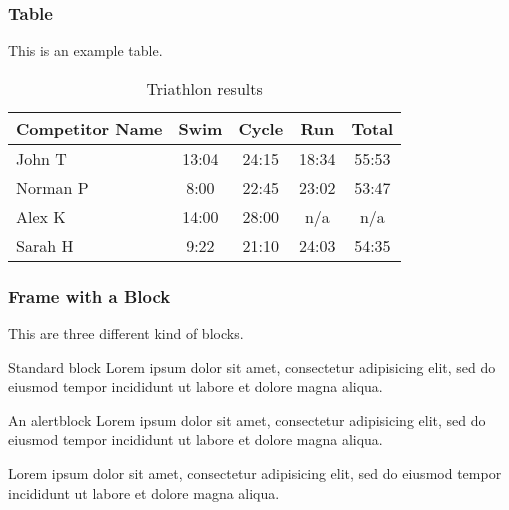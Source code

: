 \begin{frame}
    \frametitle{Table}
    This is an example table.
    \begin{table}
        \begin{tabular}{l | c | c | c | c }
            Competitor Name & Swim & Cycle & Run & Total \\
            \hline \hline
            John T & 13:04 & 24:15 & 18:34 & 55:53 \\ 
            Norman P & 8:00 & 22:45 & 23:02 & 53:47\\
            Alex K & 14:00 & 28:00 & n/a & n/a\\
            Sarah H & 9:22 & 21:10 & 24:03 & 54:35 
        \end{tabular}
        \caption{Triathlon results}
    \end{table}
\end{frame}

\begin{frame}
    \frametitle{Frame with a Block}
    This are three different kind of blocks.
    \begin{block}{Standard block}
        Lorem ipsum dolor sit amet, consectetur adipisicing elit, 
        sed do eiusmod tempor incididunt ut labore et 
        dolore magna aliqua.
    \end{block}
    \begin{alertblock}{An alertblock}
        Lorem ipsum dolor sit amet, consectetur adipisicing elit, 
        sed do eiusmod tempor incididunt ut labore et 
        dolore magna aliqua.
    \end{alertblock}
    \begin{example}
        Lorem ipsum dolor sit amet, consectetur adipisicing elit, 
        sed do eiusmod tempor incididunt ut labore et
        dolore magna aliqua.
    \end{example}
\end{frame}